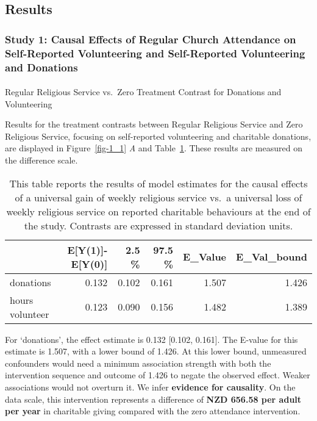 \documentclass[
  single column]{article}
\makeatletter
\let\oldparagraph\paragraph
\renewcommand{\paragraph}{
    \@ifstar
      \xxxParagraphStar
      \xxxParagraphNoStar
  }
\newcommand{\xxxParagraphStar}[1]{\oldparagraph*{#1}\mbox{}}
\newcommand{\xxxParagraphNoStar}[1]{\oldparagraph{#1}\mbox{}}
\makeatother
\begin{document}
\newpage{}

\subsection{Results}\label{results}

\subsubsection{Study 1: Causal Effects of Regular Church Attendance on
Self-Reported Volunteering and Self-Reported Volunteering and
Donations}\label{study-1-causal-effects-of-regular-church-attendance-on-self-reported-volunteering-and-self-reported-volunteering-and-donations}

\paragraph{Regular Religious Service vs.~Zero Treatment Contrast for
Donations and
Volunteering}\label{regular-religious-service-vs.-zero-treatment-contrast-for-donations-and-volunteering}

Results for the treatment contrasts between Regular Religious Service
and Zero Religious Service, focusing on self-reported volunteering and
charitable donations, are displayed in Figure~\ref{fig-1_1} \emph{A} and
Table~\ref{tbl-1_1}. These results are measured on the difference scale.

\begin{longtable}[]{@{}lrrrrr@{}}

\caption{\label{tbl-1_1}This table reports the results of model
estimates for the causal effects of a universal gain of weekly religious
service vs.~a universal loss of weekly religious service on reported
charitable behaviours at the end of the study. Contrasts are expressed
in standard deviation units.}

\tabularnewline

\toprule\noalign{}
& E{[}Y(1){]}-E{[}Y(0){]} & 2.5 \% & 97.5 \% & E\_Value &
E\_Val\_bound \\
\midrule\noalign{}
\endhead
\bottomrule\noalign{}
\endlastfoot
donations & 0.132 & 0.102 & 0.161 & 1.507 & 1.426 \\
hours volunteer & 0.123 & 0.090 & 0.156 & 1.482 & 1.389 \\

\end{longtable}

For `donations', the effect estimate is 0.132 {[}0.102, 0.161{]}. The
E-value for this estimate is 1.507, with a lower bound of 1.426. At this
lower bound, unmeasured confounders would need a minimum association
strength with both the intervention sequence and outcome of 1.426 to
negate the observed effect. Weaker associations would not overturn it.
We infer \textbf{evidence for causality}. On the data scale, this
intervention represents a difference of \textbf{NZD 656.58 per adult per
year} in charitable giving compared with the zero attendance
intervention.
\end{document}
